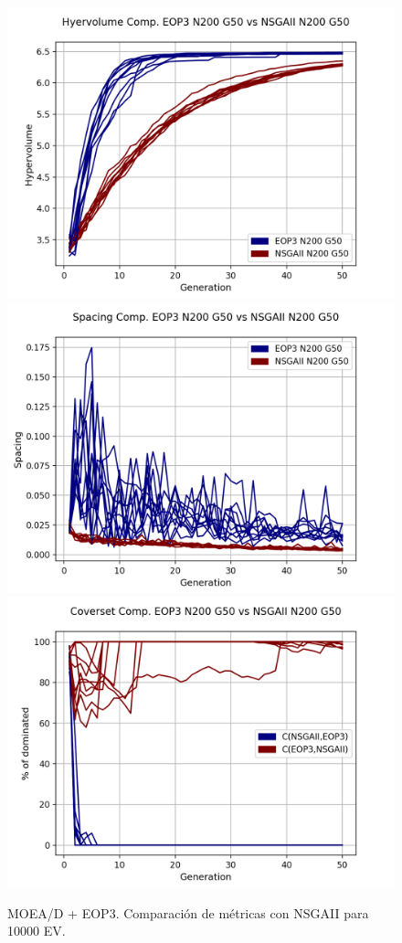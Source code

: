 \begin{figure}[H]
\includegraphics[scale=0.35]{../METRICS_PLOTS/Hypervol_COMP_EOP3N200G50_NSGAIIN200G50.png}
\includegraphics[scale=0.35]{../METRICS_PLOTS/Spacing_COMP_EOP3N200G50_NSGAIIN200G50.png}
\includegraphics[scale=0.35]{../METRICS_PLOTS/CoverSet_COMP_EOP3N200G50_NSGAIIN200G50.png}\\
\caption{MOEA/D + EOP3. Comparación de métricas con NSGAII para 10000 EV.}
\label{fig:23}
\end{figure}

